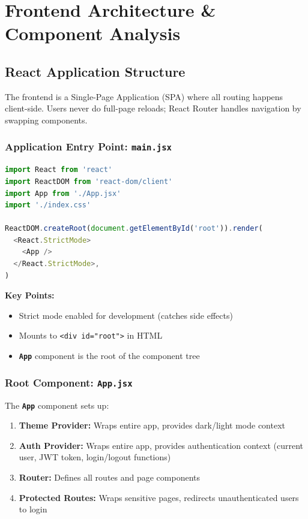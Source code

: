 \documentclass[12pt,a4paper,oneside]{article}
\newcommand{\fileref}[1]{\texttt{#1}}
\newcommand{\classname}[1]{\texttt{\textbf{#1}}}
\begin{document}
\newpage


\section{Frontend Architecture \& Component Analysis}

\subsection{React Application Structure}

The frontend is a Single-Page Application (SPA) where all routing happens client-side. Users never do full-page reloads; React Router handles navigation by swapping components.

\subsubsection{Application Entry Point: \fileref{main.jsx}}

\begin{lstlisting}[language=JavaScript, caption=Frontend Entry Point]
import React from 'react'
import ReactDOM from 'react-dom/client'
import App from './App.jsx'
import './index.css'

ReactDOM.createRoot(document.getElementById('root')).render(
  <React.StrictMode>
    <App />
  </React.StrictMode>,
)
\end{lstlisting}

\textbf{Key Points:}
\begin{itemize}
    \item Strict mode enabled for development (catches side effects)
    \item Mounts to \texttt{<div id="root">} in HTML
    \item \classname{App} component is the root of the component tree
\end{itemize}

\subsubsection{Root Component: \fileref{App.jsx}}

The \classname{App} component sets up:

\begin{enumerate}
    \item \textbf{Theme Provider:} Wraps entire app, provides dark/light mode context
    \item \textbf{Auth Provider:} Wraps entire app, provides authentication context (current user, JWT token, login/logout functions)
    \item \textbf{Router:} Defines all routes and page components
    \item \textbf{Protected Routes:} Wraps sensitive pages, redirects unauthenticated users to login
\end{enumerate}
\end{document}
